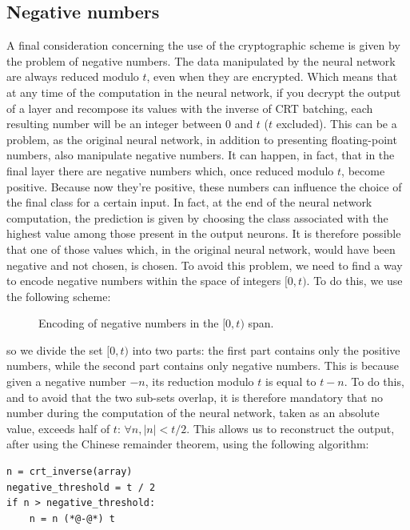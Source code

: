 \subsection{Negative numbers}

A final consideration concerning the use of the cryptographic scheme is given by the problem of negative numbers. The data manipulated by the neural network are always reduced modulo $t$, even when they are encrypted. Which means that at any time of the computation in the neural network, if you decrypt the output of a layer and recompose its values with the inverse of CRT batching, each resulting number will be an integer between 0 and $t$ ($t$ excluded). This can be a problem, as the original neural network, in addition to presenting floating-point numbers, also manipulate negative numbers. It can happen, in fact, that in the final layer there are negative numbers which, once reduced modulo $t$, become positive. Because now they're positive, these numbers can influence the choice of the final class for a certain input. In fact, at the end of the neural network computation, the prediction is given by choosing the class associated with the highest value among those present in the output neurons. It is therefore possible that one of those values which, in the original neural network, would have been negative and not chosen, is chosen. To avoid this problem, we need to find a way to encode negative numbers within the space of integers $[0, t)$. To do this, we use the following scheme:

\begin{figure}[H]
	\centering
    \caption{Encoding of negative numbers in the $[0,t)$ span.}
    \label{fig:im1}
\end{figure}

\noindent so we divide the set $[0, t)$ into two parts: the first part contains only the positive numbers, while the second part contains only negative numbers. This is because given a negative number $-n$, its reduction modulo $t$ is equal to $t-n$. To do this, and to avoid that the two sub-sets overlap, it is therefore mandatory that no number during the computation of the neural network, taken as an absolute value, exceeds half of $t$: $\forall  n, |n|<t/2$. This allows us to reconstruct the output, after using the Chinese remainder theorem, using the following algorithm:


\begin{lstlisting}[frame=single]
n = crt_inverse(array)
negative_threshold = t / 2
if n > negative_threshold:
    n = n (*@-@*) t
\end{lstlisting}
